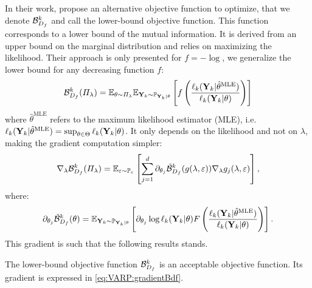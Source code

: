 In their work, \citet{nalisnick_learning_2017} propose
an alternative objective function to optimize, that we denote $\mathcal{B}_{D_f}^k$ and call the lower-bound objective function. 
This function corresponds to a lower bound of the mutual information. It is derived from an upper bound on the marginal distribution and relies on maximizing the likelihood. Their approach is only presented for $f=-\log$, we generalize the lower bound for any decreasing function $f$: 
\begin{equation}\label{eq:Bdf}
    \mathcal{B}_{D_f}^k(\varPi_\lambda) =  \mathbb{E}_{\theta\sim\varPi_\lambda}\mathbb{E}_{\mathbf{Y}_k\sim\mathbb{P}_{\mathbf{Y}_k|\theta}}\left[ f\left(\frac{\ell_k(\mathbf{Y}_k|\hat{\theta}^{\text{MLE}})}{\ell_k(\mathbf{Y}_k|\theta)}\right)\right]
\end{equation}
where $\hat{\theta}^{\text{MLE}}$ refers to the maximum likelihood estimator (MLE), i.e. $\ell_k(\mathbf{Y}_k|\hat{\theta}^{\text{MLE}})=\sup_{\theta\in\Theta}\ell_k(\mathbf{Y}_k|\theta) $. 
It only depends on the likelihood and not on $\lambda$, making  the gradient computation simpler: 
\begin{equation}\label{eq:VARP:gradientBdf}
    \nabla_\lambda \mathcal{B}^k_{D_f}(\varPi_{\lambda}) = \mathbb{E}_{\varepsilon\sim\mathbb{P}_\varepsilon}\left[\sum_{j=1}^d\partial_{\theta_j} \Tilde{\mathcal{B}}^k_{D_f}(g(\lambda,\varepsilon))\nabla_\lambda g_j(\lambda,\varepsilon)\right],
\end{equation}
where: 
\begin{equation}
    \partial_{\theta_j}\Tilde{\mathcal{B}}_{D_f}^k(\theta) = \mathbb{E}_{\mathbf{Y}_k \sim \mathbb{P}_{\mathbf{Y}_k|\theta}}\left[ \partial_{\theta_j} \log \ell_k(\mathbf{Y}_k | \theta)F \left(\frac{\ell_k(\mathbf{Y}_k|\hat{\theta}^{\text{MLE}})}{\ell_k(\mathbf{Y}_k |\theta)} \right)  \right]. 
\end{equation}
This gradient is such that the following results stands.

\begin{prop}
    The lower-bound objective function $\mathcal{B}^k_{D_f}$ is an acceptable objective function. Its gradient is expressed in \cref{eq:VARP:gradientBdf}.
\end{prop}


